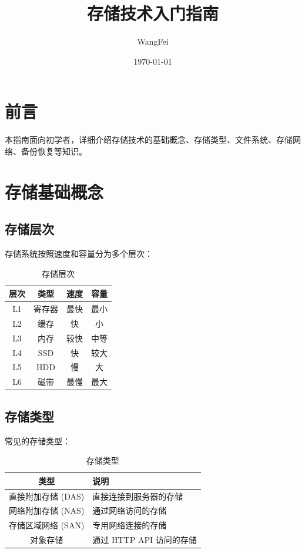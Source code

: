 \documentclass[12pt,UTF8]{ctexbook}
\title{\heiti\zihao{0} 存储技术入门指南}
\author{WangFei}
\date{\today}
\begin{document}
\maketitle
\tableofcontents

\frontmatter
\chapter{前言}

本指南面向初学者，详细介绍存储技术的基础概念、存储类型、文件系统、存储网络、备份恢复等知识。

\mainmatter

\chapter{存储基础概念}
\label{chap:storage_basics}

\section{存储层次}
\label{sec:storage_hierarchy}

存储系统按照速度和容量分为多个层次：

\begin{table}[htbp]
    \centering
    \caption{存储层次}
    \begin{tabular}{|c|c|c|c|}
        \hline
        \textbf{层次} & \textbf{类型} & \textbf{速度} & \textbf{容量} \\
        \hline
        L1 & 寄存器 & 最快 & 最小 \\
        \hline
        L2 & 缓存 & 快 & 小 \\
        \hline
        L3 & 内存 & 较快 & 中等 \\
        \hline
        L4 & SSD & 快 & 较大 \\
        \hline
        L5 & HDD & 慢 & 大 \\
        \hline
        L6 & 磁带 & 最慢 & 最大 \\
        \hline
    \end{tabular}
\end{table}

\section{存储类型}
\label{sec:storage_types}

常见的存储类型：
\begin{table}[htbp]
    \centering
    \caption{存储类型}
    \begin{tabular}{|c|p{8cm}|}
        \hline
        \textbf{类型} & \textbf{说明} \\
        \hline
        直接附加存储 (DAS) & 直接连接到服务器的存储 \\
        \hline
        网络附加存储 (NAS) & 通过网络访问的存储 \\
        \hline
        存储区域网络 (SAN) & 专用网络连接的存储 \\
        \hline
        对象存储 & 通过 HTTP API 访问的存储 \\
        \hline
    \end{tabular}
\end{table}
\end{document}
